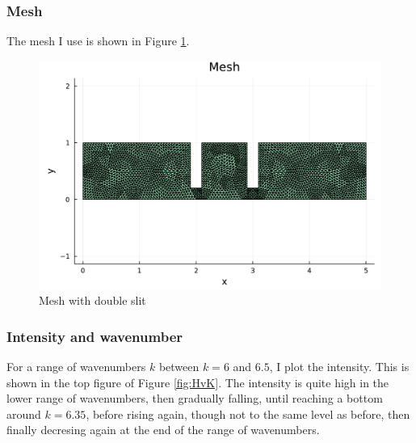 \documentclass[aps, 12pt]{revtex4}
\begin{document}
\subsubsection{Mesh}
The mesh I use is shown in Figure \ref{fig:mesh}.
\begin{figure}
    \includegraphics[width=\linewidth]{mesh.pdf}
    \caption{Mesh with double slit}
    \label{fig:mesh}
\end{figure}

\subsubsection{Intensity and wavenumber}
For a range of wavenumbers $k$ between $k=6$ and $6.5$, I plot the intensity. This is shown in the top figure of Figure \ref{fig:HvK}. The intensity is quite high in the lower range of wavenumbers, then gradually falling, until reaching a bottom around $k=6.35$, before rising again, though not to the same level as before, then finally decresing again at the end of the range of wavenumbers.
\end{document}
